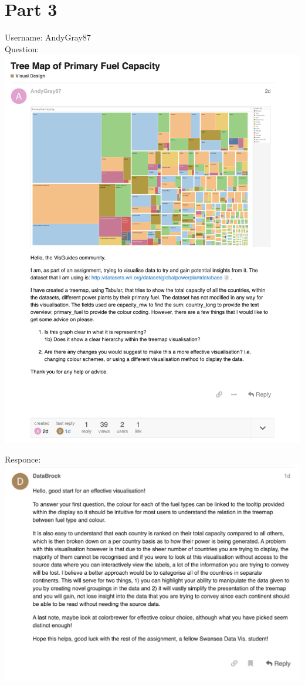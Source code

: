 \hypertarget{part-3}{%
\section{Part 3}\label{part-3}}
\begin{flushleft}
	Username: AndyGray87 \\
	Question: \\
	\centering \includegraphics[height=17.5cm]{Question}
	\\
\end{flushleft}
\begin{flushleft}
	Responce: \\
	\centering \includegraphics[width=15cm]{answer}
\end{flushleft}
